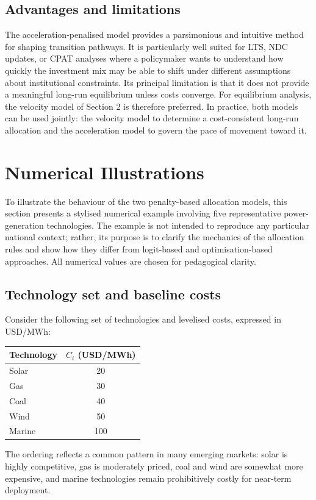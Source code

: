 \documentclass[preprint,authoryear,12pt]{elsarticle}
\begin{document}
\subsection{Advantages and limitations}

The acceleration-penalised model provides a parsimonious and intuitive method for shaping
transition pathways. It is particularly well suited for LTS, NDC updates, or CPAT analyses where
a policymaker wants to understand how quickly the investment mix may be able to shift under
different assumptions about institutional constraints. Its principal limitation is that it does not
provide a meaningful long-run equilibrium unless costs converge. For equilibrium analysis, the
velocity model of Section 2 is therefore preferred. In practice, both models can be used
jointly: the velocity model to determine a cost-consistent long-run allocation and the acceleration
model to govern the pace of movement toward it.

\newpage

\section{Numerical Illustrations}

To illustrate the behaviour of the two penalty-based allocation models, this section presents a
stylised numerical example involving five representative power-generation technologies. The
example is not intended to reproduce any particular national context; rather, its purpose is to
clarify the mechanics of the allocation rules and show how they differ from logit-based and
optimisation-based approaches. All numerical values are chosen for pedagogical clarity.

\subsection{Technology set and baseline costs}

Consider the following set of technologies and levelised costs, expressed in USD/MWh:
\begin{center}
\begin{tabular}{l c}
\toprule
Technology & $C_i$ (USD/MWh) \\
\midrule
Solar     & 20 \\
Gas       & 30 \\
Coal      & 40 \\
Wind      & 50 \\
Marine    & 100 \\
\bottomrule
\end{tabular}
\end{center}
The ordering reflects a common pattern in many emerging markets: solar is highly competitive,
gas is moderately priced, coal and wind are somewhat more expensive, and marine technologies
remain prohibitively costly for near-term deployment.
\end{document}
